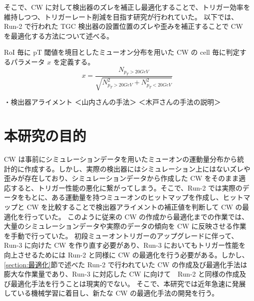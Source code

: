 そこで、CW に対して検出器のズレを補正し最適化することで、トリガー効率を維持しつつ、トリガーレート削減を目指す研究が行われていた。
以下では、Run-2 で行われた TGC 検出器の設置位置のズレや歪みを補正することで CW を最適化する方法について述べる。


RoI 毎に pT 閾値を境目としたミューオン分布を用いた CW の cell 毎に判定するパラメータ $x$ を定義する。
\begin{equation}
    x = \frac{N_{p_{T}>20GeV}}{\sqrt{N^2_{p_{T}>20GeV}+N^2_{p_{T}<20GeV}}}
　\label{equ:fitting}
\end{equation}


・検出器アライメント
＜山内さんの手法＞
＜木戸さんの手法の説明＞


\section{本研究の目的}
CW は事前にシミュレーションデータを用いたミューオンの運動量分布から統計的に作成する。しかし、実際の検出器にはシミュレーション上にはないズレや歪みが存在しており、シミュレーションデータから作成した CW をそのまま適応すると、トリガー性能の悪化に繋がってしまう。そこで、Run-2 では実際のデータをもとに、ある運動量を持つミューオンのヒットマップを作成し、ヒットマップと CW を比較することで検出器アライメントの補正値を判断して CW の最適化を行っていた。
このように従来の CW の作成から最適化までの作業では、大量のシミュレーションデータや実際のデータの傾向を CW に反映させる作業を手動で行っていた。
初段ミューオントリガーのアップグレードに伴って、Run-3 に向けた CW を作り直す必要があり、Run-3 においてもトリガー性能を向上させるためには Run-2 と同様に CW の最適化を行う必要がある。しかし、\ref{section:最適化}節で述べた Run-2 で行われていた CW の作成及び最適化手法は膨大な作業量であり、Run-3 に対応した CW に向けて　Run-2 と同様の作成及び最適化手法を行うことは現実的でない。
そこで、本研究では近年急速に発展している機械学習に着目し、新たな CW の最適化手法の開発を行う。















